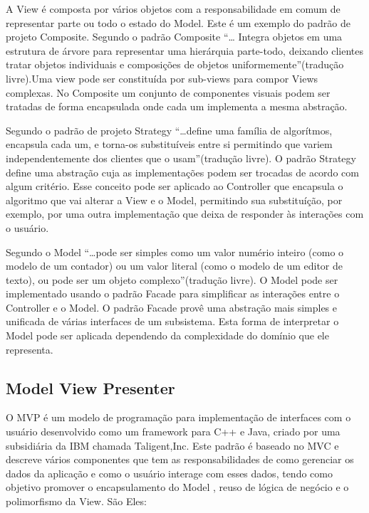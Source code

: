 \documentclass[conference]{IEEEtran}
\begin{document}
A View é composta por vários objetos com a responsabilidade em comum de
representar parte ou todo o estado do Model. Este é um exemplo do padrão de
projeto Composite. Segundo \cite{gof} o padrão Composite ``\ldots
Integra objetos em uma estrutura de árvore para representar uma hierárquia
parte-todo, deixando clientes tratar objetos individuais e composições de
objetos uniformemente''(tradução livre).Uma view pode ser constituída por
sub-views para compor Views complexas. No Composite  um conjunto de componentes
visuais podem ser tratadas de forma encapsulada onde cada um implementa a
mesma abstração. 

Segundo \cite{gof} o padrão de projeto Strategy ``\ldots define uma
família de algorítmos, encapsula cada um, e torna-os substituíveis entre si
permitindo que variem independentemente dos clientes que o usam''(tradução
livre). O padrão Strategy define uma abstração cuja as implementações podem ser
trocadas de acordo com algum critério. Esse conceito pode ser aplicado ao
Controller que encapsula o algoritmo que vai alterar a View e o Model,
permitindo sua substituíção, por exemplo, por uma outra implementação que deixa
de responder às interações com o usuário.

Segundo \cite{krasnerPope1988} o Model ``\ldots pode ser simples como
um valor numério inteiro (como o modelo de um contador) ou um valor literal
(como o modelo de um editor de texto), ou pode ser um objeto complexo''(tradução
livre). O Model pode ser implementado usando o padrão Facade para simplificar
as interações entre o Controller e o Model. O padrão Facade provê
uma abstração mais simples e unificada de várias interfaces de um
subsistema\cite{gof}. Esta forma de interpretar o Model pode ser aplicada
dependendo da complexidade do domínio que ele representa.

\subsection{Model View Presenter}

O MVP é um modelo de programação para implementação de interfaces com o usuário
desenvolvido como um framework para C++ e Java, criado por uma subsidiária da
IBM chamada Taligent,Inc. Este padrão é baseado no MVC e descreve vários
componentes que tem as responsabilidades de como gerenciar os dados da aplicação
e como o usuário interage com esses dados, tendo como objetivo promover o
encapsulamento do Model , reuso de lógica de negócio e o polimorfismo da View.
São Eles:
\end{document}
